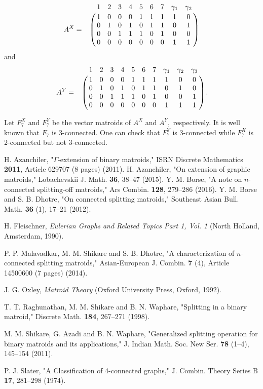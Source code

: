 \documentclass[
11pt,%
tightenlines,%
twoside,%
onecolumn,%
nofloats,%
nobibnotes,%
nofootinbib,%
superscriptaddress,%
noshowpacs,%
centertags]%
{revtex4}
\begin{document}
$$
A^X= \bordermatrix{ ~&1 &2&3&4&5&6&7&\gamma_1&\gamma_2\cr
                  ~&1& 0&0&0&1&1&1&1&0 \cr
                  ~&0&1& 0&1&0&1&1&0&1\cr
                  ~&0&0&1&1&1&0&1&0&0 \cr
                                    ~&0&0&0&0&0&0&0&1&1
                  }
$$
and   $$ A^Y= \bordermatrix{ ~&1
&2&3&4&5&6&7&\gamma_1&\gamma_2&\gamma_3\cr
                  ~&1& 0&0&0&1&1&1&1&0&0 \cr
                  ~&0&1& 0&1&0&1&1&0&1&0\cr
                  ~&0&0&1&1&1&0&1&0&0&1 \cr
                                    ~&0&0&0&0&0&0&0&1&1&1
                  }.
$$

Let $F_7^X$  and $F_7^Y$ be  the vector matroids of $A^X$ and $A^Y,$
respectively. It is well known that $F_7$ is 3-connected. One can
check that $F_7^Y$ is 3-connected while $F_7^X$ is 2-connected but
not 3-connected.



\begin{thebibliography}{99}


 {H. Azanchiler,  "$\Gamma$-extension of binary matroids,"  ISRN Discrete Mathematics {\bf 2011},  Article 629707 (8 pages) (2011).}
 {H. Azanchiler, "On extension of graphic matroids,"  Lobachevskii J. Math. {\bf 36}, 38--47 (2015).}
 { Y. M. Borse,  "A note on $n$-connected splitting-off matroids,"  Ars Combin. {\bf 128},  279--286 (2016).}
    {Y. M. Borse and  S. B. Dhotre, "On connected splitting matroids,"  Southeast Asian Bull. Math. {\bf 36} (1),  17--21 (2012).}


 {H. Fleischner, {\it Eulerian Graphs and   Related Topics Part 1, Vol. 1}  (North Holland, Amsterdam, 1990).}

   { P. P. Malavadkar, M. M. Shikare and S. B. Dhotre,  "A characterization of $n$-connected splitting matroids,"  Asian-European J. Combin. {\bf 7}
(4), Article  14500600 (7 pages) (2014). }

  {J. G. Oxley, {\it Matroid Theory} (Oxford University Press, Oxford, 1992).}

 { T. T. Raghunathan, M. M. Shikare   and  B. N. Waphare, "Splitting in a binary matroid,"   Discrete Math. {\bf 184}, 267--271 (1998).}


  {M. M. Shikare, G. Azadi and B. N. Waphare,  "Generalized splitting operation for binary matroids and its applications,"  J. Indian Math. Soc. New Ser. {\bf 78} (1--4),
145--154 (2011).}

 {P. J. Slater, "A Classification of 4-connected  graphs,"  J. Combin. Theory Series B {\bf 17},  281--298 (1974).}


\end{thebibliography}
\end{document}
